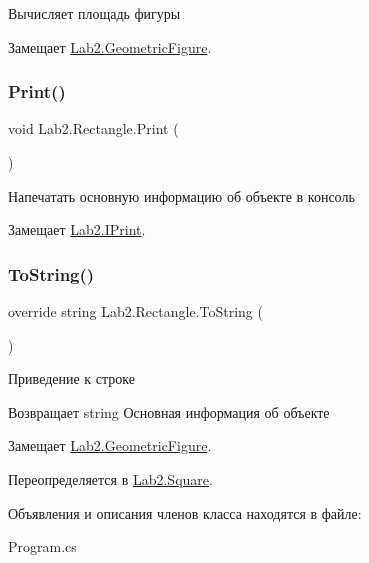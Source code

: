 Вычисляет площадь фигуры 

Замещает \hyperlink{class_lab2_1_1_geometric_figure}{Lab2.\+Geometric\+Figure}.

\mbox{\label{class_lab2_1_1_rectangle_a7bc8ce3f09ba299aba57045c396b6b4e}} 
\subsubsection{\texorpdfstring{Print()}{Print()}}
{\footnotesize\ttfamily void Lab2.\+Rectangle.\+Print (\begin{DoxyParamCaption}{ }\end{DoxyParamCaption})}

Напечатать основную информацию об объекте в консоль 

Замещает \hyperlink{interface_lab2_1_1_i_print}{Lab2.\+I\+Print}.

\mbox{\label{class_lab2_1_1_rectangle_a6c03cbd28985951c1c167b51ed47cdd4}} 
\subsubsection{\texorpdfstring{To\+String()}{ToString()}}
{\footnotesize\ttfamily override string Lab2.\+Rectangle.\+To\+String (\begin{DoxyParamCaption}{ }\end{DoxyParamCaption})\hspace{0.3cm}{\ttfamily [virtual]}}

Приведение к строке \begin{DoxyReturn}{Возвращает}
string Основная информация об объекте 
\end{DoxyReturn}


Замещает \hyperlink{class_lab2_1_1_geometric_figure}{Lab2.\+Geometric\+Figure}.



Переопределяется в \hyperlink{class_lab2_1_1_square_ac43e17280bb521a3466a38ec0e4742eb}{Lab2.\+Square}.



Объявления и описания членов класса находятся в файле\+:\begin{DoxyCompactItemize}
\item 
Program.\+cs\end{DoxyCompactItemize}
